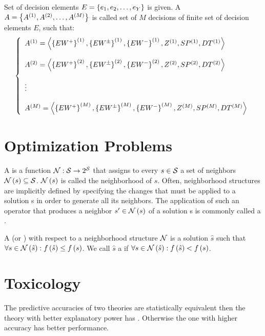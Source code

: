 \begin{defi}[Profile]
Set of decision elements $E=\left\{ e_1,e_2,\ldots,e_Y\right\}$ is given. A  $A=\left\{ A^{(1)},A^{(2)},\ldots,A^{(M)}\right\}$ is called set of $M$ decisions of finite set of decision elements $E$, such that:
\begin{equation}
\left\{\begin{array}{l}
A^{(1)}=\left\langle \left\{ EW^+\right\}^{(1)},\left\{ EW^{\pm}\right\}^{(1)},\left\{ EW^-\right\}^{(1)},Z^{(1)},SP^{(1)},DT^{(1)}\right\rangle\\\\
A^{(2)}=\left\langle \left\{ EW^+\right\}^{(2)},\left\{ EW^{\pm}\right\}^{(2)},\left\{ EW^-\right\}^{(2)},Z^{(2)},SP^{(2)},DT^{(2)}\right\rangle\\\\
\vdots\\\\
A^{(M)}=\left\langle \left\{ EW^+\right\}^{(M)},\left\{ EW^{\pm}\right\}^{(M)},\left\{ EW^-\right\}^{(M)},Z^{(M)},SP^{(M)},DT^{(M)}\right\rangle
\end{array}\right.
\end{equation}
\cite{conf/fedcsis/Sobieska-KarpinskaH12}
\end{defi}

\section{Optimization Problems}

\begin{defi}
A  is a function $\mathcal{N}:\mathcal{S}\rightarrow 2^{\mathcal{S}}$ that assigns to every $s\in\mathcal{S}$ a set of neighbors $\mathcal{N}\left(s\right)\subseteq\mathcal{S}$. $\mathcal{N}\left(s\right)$ is called the neighborhood of $s$. Often, neighborhood structures are implicitly defined by specifying the changes that must be applied to a solution s in order to generate all its neighbors. The application of such an operator that produces a neighbor $s'\in\mathcal{N}\left(s\right)$ of a solution s is commonly called a .\cite{alba05}
\end{defi}

\begin{defi}
A  (or ) with respect to a neighborhood structure $\mathcal{N}$ is a solution $\hat{s}$ such that $\forall s\in\mathcal{N}\left(\hat{s}\right):f\left(\hat{s}\right)\leq f\left(s\right)$. We call $\hat{s}$ a  if $\forall s\in\mathcal{N}\left(\hat{s}\right):f\left(\hat{s}\right)<f\left(s\right)$.\cite{alba05}
\end{defi}

\section{Toxicology}

\begin{defi}
The predictive accuracies of two theories are statistically equivalent then the theory with better explanatory power has . Otherwise the one with higher accuracy has better performance.
\cite{conf/ijcai/SrinivasanKMS97}
\end{defi}

